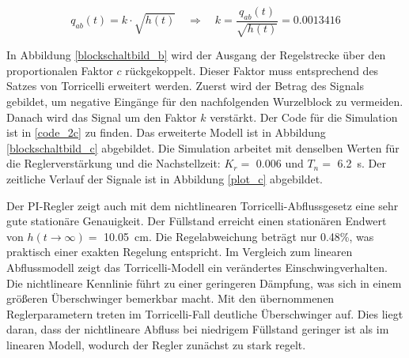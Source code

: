 \begin{equation}
    q_{ab}(t)=k\cdot \sqrt{h(t)} \quad \Longrightarrow \quad k=\frac{q_{ab}(t)}{\sqrt{h(t)}} = 0.0013416
\end{equation}

In Abbildung \ref{blockschaltbild_b} wird der Ausgang der Regelstrecke über den proportionalen Faktor $c$ rückgekoppelt. Dieser Faktor muss entsprechend des Satzes von Torricelli erweitert werden. Zuerst wird der Betrag des Signals gebildet, um negative Eingänge für den nachfolgenden Wurzelblock zu vermeiden. Danach wird das Signal um den Faktor $k$ verstärkt. Der Code für die Simulation ist in \ref{code_2c} zu finden. Das erweiterte Modell ist in Abbildung \ref{blockschaltbild_c} abgebildet. Die Simulation arbeitet mit denselben Werten für die Reglerverstärkung und die Nachstellzeit: $K_r=$ \SI{0.006}{} und $T_n=$ \SI{6.2}{s}. Der zeitliche Verlauf der Signale ist in Abbildung \ref{plot_c} abgebildet.

Der PI-Regler zeigt auch mit dem nichtlinearen Torricelli-Abflussgesetz eine sehr gute stationäre Genauigkeit. Der Füllstand erreicht einen stationären Endwert von $h(t \to \infty) = $ \SI{10.05}{cm}. Die Regelabweichung beträgt nur 0.48\%, was praktisch einer exakten Regelung entspricht.
Im Vergleich zum linearen Abflussmodell zeigt das Torricelli-Modell ein verändertes Einschwingverhalten. Die nichtlineare Kennlinie führt zu einer geringeren Dämpfung, was sich in einem größeren Überschwinger bemerkbar macht.
Mit den übernommenen Reglerparametern treten im Torricelli-Fall deutliche Überschwinger auf. Dies liegt daran, dass der nichtlineare Abfluss bei niedrigem Füllstand geringer ist als im linearen Modell, wodurch der Regler zunächst zu stark regelt.

